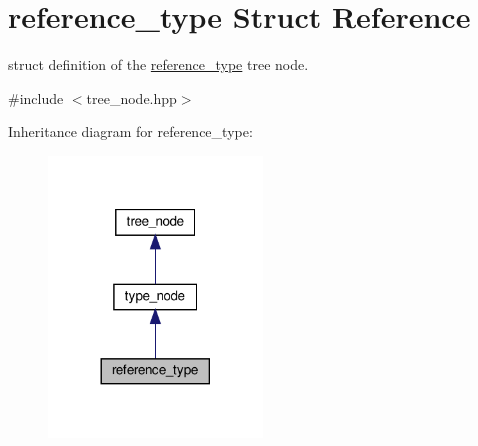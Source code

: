 \hypertarget{structreference__type}{}\section{reference\+\_\+type Struct Reference}
\label{structreference__type}


struct definition of the \hyperlink{structreference__type}{reference\+\_\+type} tree node.  




{\ttfamily \#include $<$tree\+\_\+node.\+hpp$>$}



Inheritance diagram for reference\+\_\+type\+:
\nopagebreak
\begin{figure}[H]
\begin{center}
\leavevmode
\includegraphics[width=161pt]{d9/d97/structreference__type__inherit__graph}
\end{center}
\end{figure}


